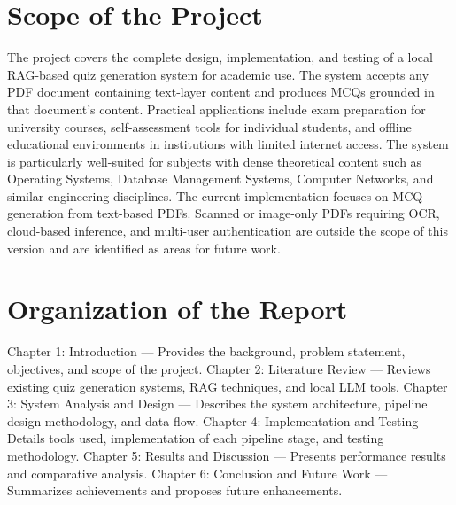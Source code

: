 \documentclass[12pt,a4paper]{report}
\begin{document}
\section{Scope of the Project}
The project covers the complete design, implementation, and testing of a local RAG-based quiz generation system for academic use. The system accepts any PDF document containing text-layer content and produces MCQs grounded in that document's content.
Practical applications include exam preparation for university courses, self-assessment tools for individual students, and offline educational environments in institutions with limited internet access. The system is particularly well-suited for subjects with dense theoretical content such as Operating Systems, Database Management Systems, Computer Networks, and similar engineering disciplines.
The current implementation focuses on MCQ generation from text-based PDFs. Scanned or image-only PDFs requiring OCR, cloud-based inference, and multi-user authentication are outside the scope of this version and are identified as areas for future work.
\section{Organization of the Report}
Chapter 1: Introduction — Provides the background, problem statement, objectives, and scope of the project.
Chapter 2: Literature Review — Reviews existing quiz generation systems, RAG techniques, and local LLM tools.
Chapter 3: System Analysis and Design — Describes the system architecture, pipeline design methodology, and data flow.
Chapter 4: Implementation and Testing — Details tools used, implementation of each pipeline stage, and testing methodology.
Chapter 5: Results and Discussion — Presents performance results and comparative analysis.
Chapter 6: Conclusion and Future Work — Summarizes achievements and proposes future enhancements.
\end{document}
